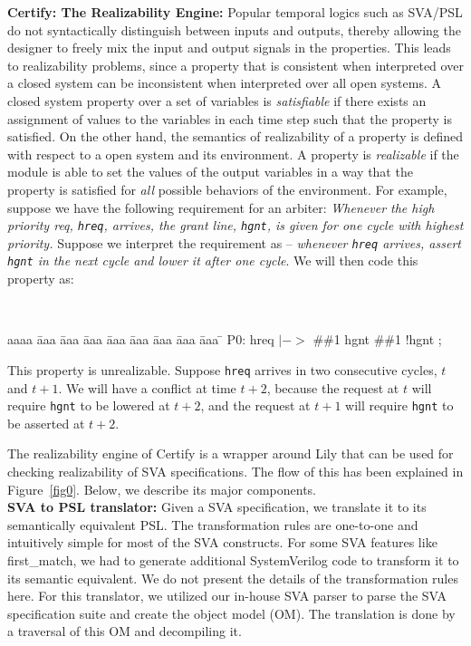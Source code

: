 \documentclass{svmult}
\begin{document}
\noindent
{\bf Certify: The Realizability Engine:}
Popular temporal logics such as SVA/PSL do not
syntactically distinguish between inputs and outputs, thereby allowing the
designer to freely mix the input and output signals in the properties. This
leads to realizability problems, since a property that
is consistent when interpreted over a closed system can be inconsistent when
interpreted over all open systems.
A closed system property over a set of variables is {\em satisfiable} if there
exists an assignment of values to the variables in each time step such that
the property is satisfied. On the other hand, the semantics of realizability 
of a property is defined with respect to a open system and its environment.
A property is {\em realizable} if the module is able to set the values of the
output variables in a way that the property is satisfied for {\em all}
possible behaviors of the environment. For example, suppose we have the 
following requirement for an arbiter:
{\em Whenever the high priority req, {\tt hreq}, arrives, the grant
    line, {\tt hgnt}, is given for one cycle with highest priority.}
Suppose we interpret the requirement as -- {\em whenever {\tt hreq} arrives,
assert {\tt hgnt} in the next cycle and lower it after one cycle}. We will
then code this property as:
{\tt
\begin{tabbing}
aaaa \= aaa \= aaa \= aaa \= aaa \= aaa \= aaa \= aaa \= aaa \= \kill
\>\>P0: hreq $|->$ \#\#1 hgnt \#\#1 !hgnt ;
\end{tabbing}
}
\noindent
This property is unrealizable. Suppose {\tt hreq} arrives in two consecutive
cycles, $t$ and $t+1$. We will have a conflict at time $t+2$, because the
request at $t$ will require {\tt hgnt} to be lowered at $t+2$, and the
request at $t+1$ will require {\tt hgnt} to be asserted at $t+2$.

The realizability engine of Certify is a wrapper around Lily that can 
be used for checking realizability of SVA specifications. The flow of 
this has been explained in Figure~\ref{fig0}. Below, we describe its 
major components. \\

\noindent
{\bf SVA to PSL translator:} Given a SVA specification, we translate it 
to its semantically equivalent 
PSL. The transformation rules are one-to-one and intuitively simple for most 
of the SVA constructs. For some SVA features like first\_match, we had to 
generate additional SystemVerilog code to transform it to its semantic 
equivalent. We do not present the details of the transformation rules here. 
For this translator, we utilized our in-house SVA parser to parse the SVA 
specification suite and create the object model (OM). The translation 
is done by a traversal of this OM and decompiling it. \\
\end{document}
